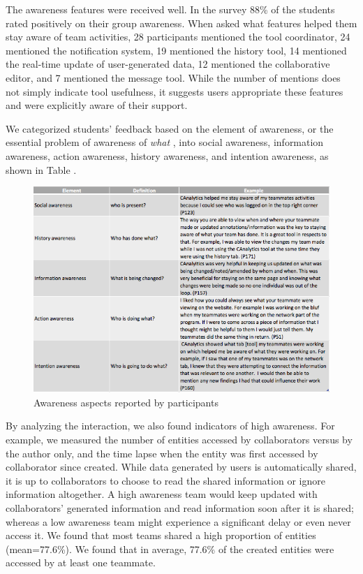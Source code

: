 \documentclass[]{article}
\begin{document}
The awareness features were received well. In the survey 88\% of the
students rated positively on their group awareness. When asked what
features helped them stay aware of team activities, 28 participants
mentioned the tool coordinator, 24 mentioned the notification system, 19
mentioned the history tool, 14 mentioned the real-time update of
user-generated data, 12 mentioned the collaborative editor, and 7
mentioned the message tool. While the number of mentions does not simply
indicate tool usefulness, it suggests users appropriate these features
and were explicitly aware of their support.

We categorized students' feedback based on the element of awareness, or
the essential problem of awareness of \emph{what}
\autocite{Schmidt2002}, into social awareness, information awareness,
action awareness, history awareness, and intention awareness, as shown
in Table \autocite{tab:awareness}.

\begin{figure}
\centering
\includegraphics{./questionnaire/awareness.png}
\caption{Awareness aspects reported by
participants}\label{tab:awareness}
\end{figure}

By analyzing the interaction, we also found indicators of high
awareness. For example, we measured the number of entities accessed by
collaborators versus by the author only, and the time lapse when the
entity was first accessed by collaborator since created. While data
generated by users is automatically shared, it is up to collaborators to
choose to read the shared information or ignore information altogether.
A high awareness team would keep updated with collaborators' generated
information and read information soon after it is shared; whereas a low
awareness team might experience a significant delay or even never access
it. We found that most teams shared a high proportion of entities
(mean=77.6\%). We found that in average, 77.6\% of the created entities
were accessed by at least one teammate.
\end{document}
